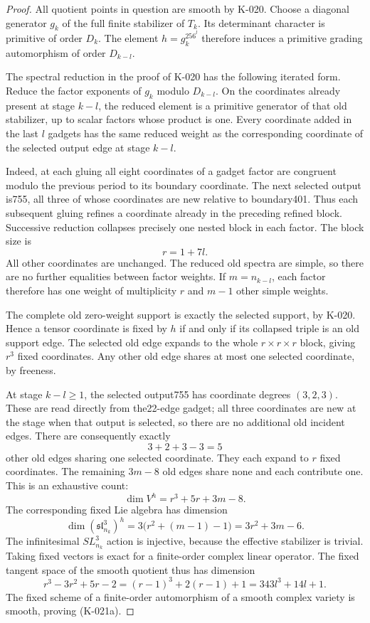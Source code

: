 \begin{proof}
All quotient points in question are smooth by K-020.  Choose a
diagonal generator $g_k$ of the full finite stabilizer of $T_k$.
Its determinant character is primitive of order $D_k$.
The element $h=g_k^{256^l}$ therefore induces a primitive grading
automorphism of order $D_{k-l}$.

The spectral reduction in the proof of K-020 has the following
iterated form.  Reduce the factor exponents of $g_k$ modulo
$D_{k-l}$.  On the coordinates already present at stage $k-l$,
the reduced element is a primitive generator of that old
stabilizer, up to scalar factors whose product is one.  Every
coordinate added in the last $l$ gadgets has the same reduced
weight as the corresponding coordinate of the selected output
edge at stage $k-l$.

Indeed, at each gluing all eight coordinates of a gadget factor
are congruent modulo the previous period to its boundary
coordinate.  The next selected output is755, all three of whose
coordinates are new relative to boundary401.  Thus each subsequent
gluing refines a coordinate already in the preceding refined
block.  Successive reduction collapses precisely one nested
block in each factor.  The block size is
\[
                           r=1+7l.
\]
All other coordinates are unchanged.  The reduced old spectra
are simple, so there are no further equalities between factor
weights.  If $m=n_{k-l}$, each factor therefore has one weight
of multiplicity $r$ and $m-1$ other simple weights.

The complete old zero-weight support is exactly the selected
support, by K-020.  Hence a tensor coordinate is fixed by $h$
if and only if its collapsed triple is an old support edge.
The selected old edge expands to the whole $r\times r\times r$
block, giving $r^3$ fixed coordinates.  Any other old edge
shares at most one selected coordinate, by freeness.

At stage $k-l\ge1$, the selected output755 has coordinate degrees
$(3,2,3)$.  These are read directly from the22-edge gadget; all
three coordinates are new at the stage when that output is
selected, so there are no additional old incident edges.
There are consequently exactly
\[
                           3+2+3-3=5
\]
other old edges sharing one selected coordinate.  They each
expand to $r$ fixed coordinates.  The remaining $3m-8$ old edges
share none and each contribute one.  This is an exhaustive count:
\[
                       \dim V^h=r^3+5r+3m-8.             \tag{K-021c}
\]
The corresponding fixed Lie algebra has dimension
\[
 \dim(\mathfrak{sl}_{n_k}^3)^h
       =3\bigl(r^2+(m-1)-1\bigr)=3r^2+3m-6.             \tag{K-021d}
\]
The infinitesimal $SL_{n_k}^3$ action is injective, because the
effective stabilizer is trivial.  Taking fixed vectors is exact
for a finite-order complex linear operator.  The fixed tangent
space of the smooth quotient thus has dimension
\[
 r^3-3r^2+5r-2=(r-1)^3+2(r-1)+1=343l^3+14l+1.
\]
The fixed scheme of a finite-order automorphism of a smooth
complex variety is smooth, proving (K-021a).


\end{proof}
